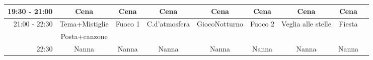 \documentclass[a4paper]{article}
\begin{document}
\begin{landscape}
\begin{adjustwidth}{-2.5cm}{-1cm}
\begin{tabular}{|r|c|c|c|c|c|c|c|c|}
        19:30 - 21:00&Cena&Cena&Cena&Cena&Cena&Cena&Cena&\\ \hline      
        \multirow{2}{*}{21:00 - 22:30}&Tema+Mistiglie&Fuoco 1&C.d'atmosfera&GiocoNotturno&Fuoco 2&Veglia alle stelle&Fiesta&\\&Posta+canzone& & & & & & & \\\hline        

        22:30&Nanna&Nanna&Nanna&Nanna&Nanna&Nanna&Nanna&\\ \hline
        \end{tabular}  
        \end{adjustwidth}
\end{landscape}

\newpage
    
\newpage
    
\newpage
    
\newpage
    
\newpage
    
\newpage
    
\newpage
    
\newpage
    
\newpage
    
    
\end{document}
